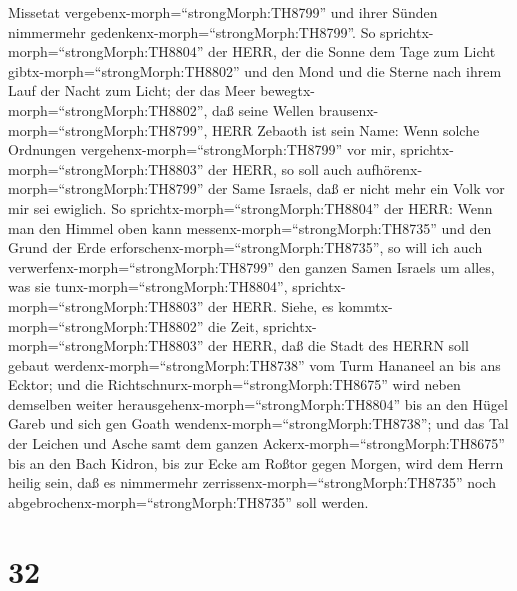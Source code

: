Missetat vergebenx-morph=``strongMorph:TH8799'' und ihrer Sünden
nimmermehr gedenkenx-morph=``strongMorph:TH8799''.  So
sprichtx-morph=``strongMorph:TH8804'' der HERR, der die Sonne dem Tage
zum Licht gibtx-morph=``strongMorph:TH8802'' und den Mond und die Sterne
nach ihrem Lauf der Nacht zum Licht; der das Meer
bewegtx-morph=``strongMorph:TH8802'', daß seine Wellen
brausenx-morph=``strongMorph:TH8799'', HERR Zebaoth ist sein Name:
 Wenn solche Ordnungen
vergehenx-morph=``strongMorph:TH8799'' vor mir,
sprichtx-morph=``strongMorph:TH8803'' der HERR, so soll auch
aufhörenx-morph=``strongMorph:TH8799'' der Same Israels, daß er nicht
mehr ein Volk vor mir sei ewiglich.  So
sprichtx-morph=``strongMorph:TH8804'' der HERR: Wenn man den Himmel oben
kann messenx-morph=``strongMorph:TH8735'' und den Grund der Erde
erforschenx-morph=``strongMorph:TH8735'', so will ich auch
verwerfenx-morph=``strongMorph:TH8799'' den ganzen Samen Israels um
alles, was sie tunx-morph=``strongMorph:TH8804'',
sprichtx-morph=``strongMorph:TH8803'' der HERR.  Siehe, es
kommtx-morph=``strongMorph:TH8802'' die Zeit,
sprichtx-morph=``strongMorph:TH8803'' der HERR, daß die Stadt des HERRN
soll gebaut werdenx-morph=``strongMorph:TH8738'' vom Turm Hananeel an
bis ans Ecktor;  und die
Richtschnurx-morph=``strongMorph:TH8675'' wird neben demselben weiter
herausgehenx-morph=``strongMorph:TH8804'' bis an den Hügel Gareb und
sich gen Goath wendenx-morph=``strongMorph:TH8738'';  und
das Tal der Leichen und Asche samt dem ganzen
Ackerx-morph=``strongMorph:TH8675'' bis an den Bach Kidron, bis zur Ecke
am Roßtor gegen Morgen, wird dem Herrn heilig sein, daß es nimmermehr
zerrissenx-morph=``strongMorph:TH8735'' noch
abgebrochenx-morph=``strongMorph:TH8735'' soll werden.

\hypertarget{section-31}{%
\section{32}\label{section-31}}

